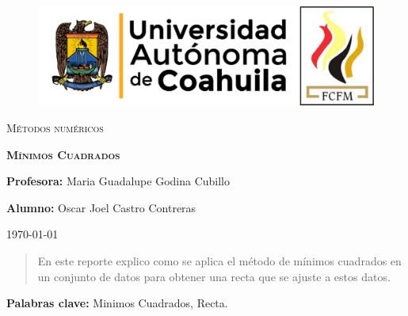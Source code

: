 \documentclass[12pt]{article}
\begin{document}
		
		\begin{titlepage}
		
			\centering
			{\bfseries
			\begin{figure}[h!]
				\centering
				\includegraphics[width=\linewidth]{Nom_UAdeC_FCFM.png} 				
			\end{figure}
			\par}
			\vspace{2cm}
			{\scshape\LARGE Métodos numéricos \par}
			\vspace{3cm}
			{\scshape\Huge \textbf{Mínimos Cuadrados} \par}
			\vfill
			{\LARGE \textbf{Profesora:} Maria Guadalupe Godina Cubillo \par}
			\vspace{3cm}
			{\LARGE \textbf{Alumno:} Oscar Joel Castro Contreras \par}
			\vfill
			{\Large \today \par}
			\thispagestyle{empty}
			
		\end{titlepage}
	
		\newpage

		\begin{abstract}
			\noindent En este reporte explico como se aplica el método de mínimos cuadrados 
			en un conjunto de datos para obtener una recta que se ajuste a estos datos.
		\end{abstract}

		\textbf{Palabras clave:} Minimos Cuadrados, Recta.
\end{document}
